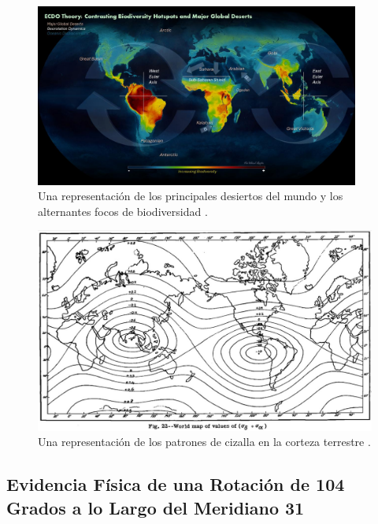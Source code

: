 \documentclass[10pt,twocolumn,letterpaper]{article}
\begin{document}
\begin{figure}[t]
\begin{center}
\includegraphics[width=0.95\textwidth]{biodiversity.jpg}
\end{center}
   \caption{Una representación de los principales desiertos del mundo y los alternantes focos de biodiversidad \cite{28}.}
\label{fig:9}
\end{figure}

\begin{figure}[t]
\begin{center}
   \includegraphics[width=1\linewidth]{meinesz3.jpg}
\end{center}
   \caption{Una representación de los patrones de cizalla en la corteza terrestre \cite{36}.}
\label{fig:8}
\label{fig:onecol}
\end{figure}

\subsection{Evidencia Física de una Rotación de 104 Grados a lo Largo del Meridiano 31}
\end{document}
